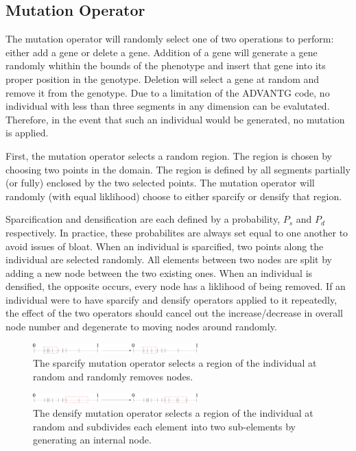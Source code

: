 \documentclass[conference]{IEEEtran}
\begin{document}
\subsection{Mutation Operator}
The mutation operator will randomly select one of two operations to perform: either add a gene or delete a gene. Addition of a gene will generate a gene randomly whithin the bounds of the phenotype and insert that gene into its proper position in the genotype. Deletion will select a gene at random and remove it from the genotype. Due to a limitation of the ADVANTG code, no individual with less than three segments in any dimension can be evalutated. Therefore, in the event that such an individual would be generated, no mutation is applied.

First, the mutation operator selects a random region. The region is chosen by choosing two points in the domain. The region is defined by all segments partially (or fully) enclosed by the two selected points. The mutation operator will randomly (with equal liklihood) choose to either sparcify or densify that region.

Sparcification and densification are each defined by a probability, $P_s$ and $P_d$ respectively. In practice, these probabilites are always set equal to one another to avoid issues of bloat. When an individual is sparcified, two points along the individual are selected randomly. All elements between two nodes are split by adding a new node between the two existing ones. When an individual is densified, the opposite occurs, every node has a liklihood of being removed. If an individual were to have sparcify and densify operators applied to it repeatedly, the effect of the two operators should cancel out the increase/decrease in overall node number and degenerate to moving nodes around randomly.
\begin{figure}[!t]
\centering
\includegraphics[width=2.5in]{mutate_sparcify}
\caption{The sparcify mutation operator selects a region of the individual at random and randomly removes nodes.}
\label{fig:sparcify}
\end{figure}
\begin{figure}[!t]
\centering
\includegraphics[width=2.5in]{mutate_densify}
\caption{The densify mutation operator selects a region of the individual at random and subdivides each element into two sub-elements by generating an internal node.}
\label{fig:densify}
\end{figure}
\end{document}
